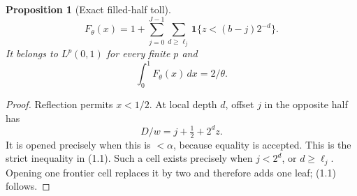 \documentclass[11pt]{article}
\numberwithin{equation}{section}
\newtheorem{proposition}[theorem]{Proposition}
\newcommand{\1}{\mathbf 1}\newcommand{\F}{\mathcal F}\newcommand{\D}{\mathcal D}
\begin{document}
\begin{proposition}[Exact filled-half toll]
\begin{equation}
 F_\theta(x)=1+\sum_{j=0}^{J-1}\sum_{d\geq\ell_j}
 \1\{z<(b-j)2^{-d}\}.                                      \tag{1.1}
\end{equation}
It belongs to $L^p(0,1)$ for every finite $p$ and
\begin{equation}\int_0^1F_\theta(x)\,dx=2/\theta.             \tag{1.2}\end{equation}
\end{proposition}
\begin{proof}
Reflection permits $x<1/2$.  At local depth $d$, offset $j$ in the opposite
half has
\[
 D/w=j+\tfrac12+2^dz.
\]
It is opened precisely when this is $<\alpha$, because equality is accepted.
This is the strict inequality in (1.1).  Such a cell exists precisely when
$j<2^d$, or $d\geq\ell_j$.  Opening one frontier cell replaces it by two and
therefore adds one leaf; (1.1) follows.


\end{proof}
\end{document}
